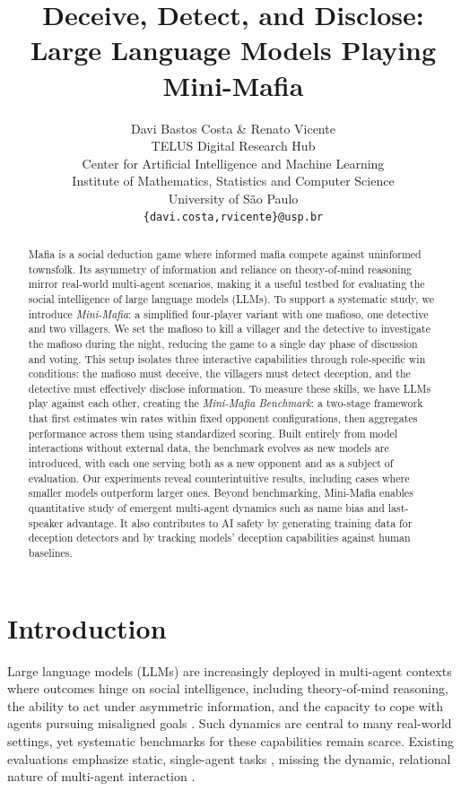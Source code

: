 \documentclass{article}
\title{Deceive, Detect, and Disclose: \\ Large Language Models Playing Mini-Mafia}
\author{Davi Bastos Costa \& Renato Vicente \\
TELUS Digital Research Hub\\ 
Center for Artificial Intelligence and Machine Learning\\
Institute of Mathematics, Statistics and Computer Science\\
University of São Paulo \\
\texttt{\{davi.costa,rvicente\}@usp.br} \\
}
\begin{document}
\maketitle


\begin{abstract}
    Mafia is a social deduction game where informed mafia compete against uninformed townsfolk. Its asymmetry of information and reliance on theory-of-mind reasoning mirror real-world multi-agent scenarios, making it a useful testbed for evaluating the social intelligence of large language models (LLMs). To support a systematic study, we introduce \textit{Mini-Mafia}: a simplified four-player variant with one mafioso, one detective and two villagers. We set the mafioso to kill a villager and the detective to investigate the mafioso during the night, reducing the game to a single day phase of discussion and voting. This setup isolates three interactive capabilities through role-specific win conditions: the mafioso must deceive, the villagers must detect deception, and the detective must effectively disclose information. To measure these skills, we have LLMs play against each other, creating the \textit{Mini-Mafia Benchmark}: a two-stage framework that first estimates win rates within fixed opponent configurations, then aggregates performance across them using standardized scoring. Built entirely from model interactions without external data, the benchmark evolves as new models are introduced, with each one serving both as a new opponent and as a subject of evaluation. Our experiments reveal counterintuitive results, including cases where smaller models outperform larger ones. Beyond benchmarking, Mini-Mafia enables quantitative study of emergent multi-agent dynamics such as name bias and last-speaker advantage. It also contributes to AI safety by generating training data for deception detectors and by tracking models’ deception capabilities against human baselines.
\end{abstract}



\section{Introduction}

Large language models (LLMs) are increasingly deployed in multi-agent contexts where outcomes hinge on social intelligence, including theory-of-mind reasoning, the ability to act under asymmetric information, and the capacity to cope with agents pursuing misaligned goals \citep{gao2024large, guo2024large, wang2024survey}. Such dynamics are central to many real-world settings, yet systematic benchmarks for these capabilities remain scarce. Existing evaluations emphasize static, single-agent tasks \citep{banerjee2024vulnerability, pan2025benchmarks}, missing the dynamic, relational nature of multi-agent interaction \citep{hou2024egosocialarena}.
\end{document}

